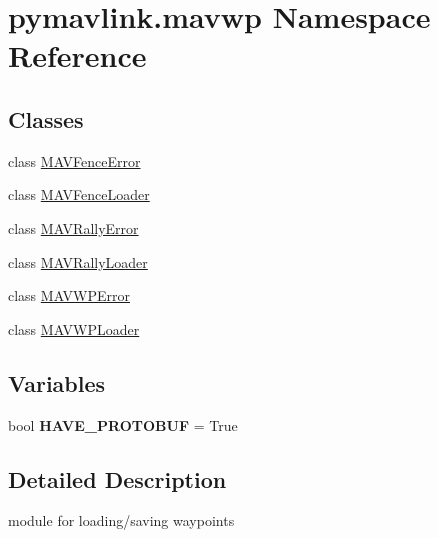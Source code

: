 \hypertarget{namespacepymavlink_1_1mavwp}{}\section{pymavlink.\+mavwp Namespace Reference}
\label{namespacepymavlink_1_1mavwp}
\subsection*{Classes}
\begin{DoxyCompactItemize}
\item 
class \hyperlink{classpymavlink_1_1mavwp_1_1MAVFenceError}{M\+A\+V\+Fence\+Error}
\item 
class \hyperlink{classpymavlink_1_1mavwp_1_1MAVFenceLoader}{M\+A\+V\+Fence\+Loader}
\item 
class \hyperlink{classpymavlink_1_1mavwp_1_1MAVRallyError}{M\+A\+V\+Rally\+Error}
\item 
class \hyperlink{classpymavlink_1_1mavwp_1_1MAVRallyLoader}{M\+A\+V\+Rally\+Loader}
\item 
class \hyperlink{classpymavlink_1_1mavwp_1_1MAVWPError}{M\+A\+V\+W\+P\+Error}
\item 
class \hyperlink{classpymavlink_1_1mavwp_1_1MAVWPLoader}{M\+A\+V\+W\+P\+Loader}
\end{DoxyCompactItemize}
\subsection*{Variables}
\begin{DoxyCompactItemize}
\item 
\mbox{\label{namespacepymavlink_1_1mavwp_a1cbe5647027552fa236516566ea69763}} 
bool {\bfseries H\+A\+V\+E\+\_\+\+P\+R\+O\+T\+O\+B\+UF} = True
\end{DoxyCompactItemize}


\subsection{Detailed Description}
\begin{DoxyVerb}module for loading/saving waypoints
\end{DoxyVerb}
 